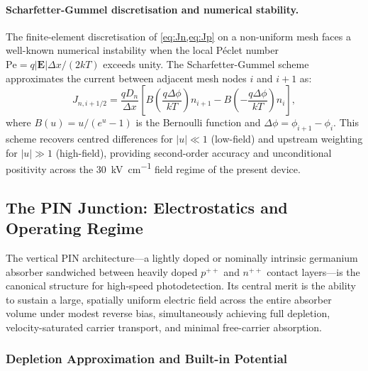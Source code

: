 \paragraph{Scharfetter-Gummel discretisation and numerical stability.}
The finite-element discretisation of \cref{eq:Jn,eq:Jp} on a non-uniform mesh
faces a well-known numerical instability when the local P\'eclet number
$\mathrm{Pe}=q|\mathbf{E}|\Delta x/(2kT)$ exceeds unity. The
Scharfetter-Gummel scheme approximates the current between adjacent mesh nodes
$i$ and $i+1$ as:
\begin{equation}
    J_{n,i+1/2}
    = \frac{qD_n}{\Delta x}\!\left[
        B\!\left(\frac{q\Delta\phi}{kT}\right)n_{i+1}
      - B\!\left(-\frac{q\Delta\phi}{kT}\right)n_i
      \right],
    \label{eq:sg_scheme}
\end{equation}
where $B(u)=u/(e^u-1)$ is the Bernoulli function and $\Delta\phi=\phi_{i+1}-\phi_i$.
This scheme recovers centred differences for $|u|\ll1$ (low-field) and
upstream weighting for $|u|\gg1$ (high-field), providing second-order accuracy
and unconditional positivity across the \SI{30}{\kilo\volt\per\centi\metre}
field regime of the present device.

\subsection[The PIN Junction: Electrostatics and Operating Regime]%
           {The PIN Junction: Electrostatics and Operating Regime}
\label{subsec:pd_pin}

The vertical PIN architecture---a lightly doped or nominally intrinsic
germanium absorber sandwiched between heavily doped $p^{++}$ and $n^{++}$ contact
layers---is the canonical structure for high-speed photodetection. Its
central merit is the ability to sustain a large, spatially uniform electric
field across the entire absorber volume under modest reverse bias, simultaneously
achieving full depletion, velocity-saturated carrier transport, and minimal
free-carrier absorption.

\subsubsection[Depletion Approximation and Built-in Potential]{Depletion Approximation and Built-in Potential}
\label{subsubsec:pd_depletion}

